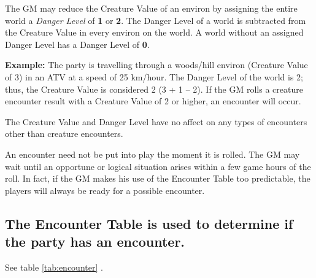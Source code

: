 The GM may reduce the Creature Value of an environ by assigning the
entire world a \emph{Danger Level} of \textbf{1} or \textbf{2}. The
Danger Level of a world is subtracted from the Creature Value in every
environ on the world. A world without an assigned Danger Level has a
Danger Level of \textbf{0}.

\textbf{Example:} The party is travelling through a woods/hill environ
(Creature Value of 3) in an ATV at a speed of 25 km/hour. The Danger
Level of the world is 2; thus, the Creature Value is considered 2 (3 +
1 -- 2). If the GM rolls a creature encounter result with a Creature
Value of 2 or higher, an encounter will occur.

The Creature Value and Danger Level have no affect on any types of
encounters other than creature encounters.

An encounter need not be put into play the moment it is rolled. The GM
may wait until an opportune or logical situation arises within a few
game hours of the roll. In fact, if the GM makes his use of the
Encounter Table too predictable, the players will always be ready for
a possible encounter.


\subsection[Encounter Table]{The Encounter Table is used to determine
  if the party has an encounter.} 
\label{sec:encounter-table}

See table \ref{tab:encounter} .

